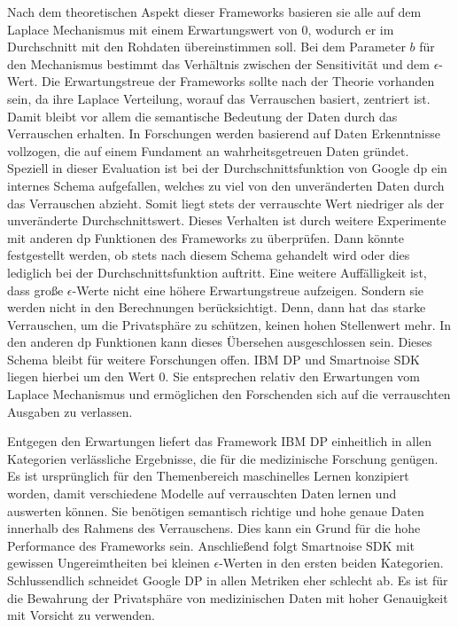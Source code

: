 Nach dem theoretischen Aspekt dieser Frameworks basieren sie alle auf dem Laplace Mechanismus mit einem Erwartungswert von $0$, wodurch er im Durchschnitt mit den Rohdaten übereinstimmen soll. Bei dem Parameter $b$ für den Mechanismus bestimmt das Verhältnis zwischen der Sensitivität und dem $\epsilon$-Wert. Die Erwartungstreue der Frameworks sollte nach der Theorie vorhanden sein, da ihre Laplace Verteilung, worauf das Verrauschen basiert, zentriert ist. Damit bleibt vor allem die semantische Bedeutung der Daten durch das Verrauschen erhalten. In Forschungen werden basierend auf Daten Erkenntnisse vollzogen, die auf einem Fundament an wahrheitsgetreuen Daten gründet. Speziell in dieser Evaluation ist bei der Durchschnittsfunktion von Google \gls{dp}  ein internes Schema aufgefallen, welches zu viel von den unveränderten Daten durch das Verrauschen abzieht. Somit liegt stets der verrauschte Wert niedriger als der unveränderte Durchschnittswert. Dieses Verhalten ist durch weitere Experimente mit anderen \gls{dp} Funktionen des Frameworks zu überprüfen. Dann könnte festgestellt werden, ob stets nach diesem Schema gehandelt wird oder dies lediglich bei der Durchschnittsfunktion auftritt. Eine weitere Auffälligkeit ist, dass große $\epsilon$-Werte nicht eine höhere Erwartungstreue aufzeigen. Sondern sie werden nicht in den Berechnungen berücksichtigt. Denn, dann hat das starke Verrauschen, um die Privatsphäre zu schützen, keinen hohen Stellenwert mehr. In den anderen \gls{dp} Funktionen kann dieses Übersehen ausgeschlossen sein. Dieses Schema bleibt für weitere Forschungen offen. IBM DP und Smartnoise SDK liegen hierbei um den Wert $0$. Sie entsprechen relativ den Erwartungen vom Laplace Mechanismus und ermöglichen den Forschenden sich auf die verrauschten Ausgaben zu verlassen.

Entgegen den Erwartungen liefert das Framework IBM DP einheitlich in allen Kategorien verlässliche Ergebnisse, die für die medizinische Forschung genügen. Es ist ursprünglich für den Themenbereich maschinelles Lernen konzipiert worden, damit verschiedene Modelle auf verrauschten Daten lernen und auswerten können. Sie benötigen semantisch richtige und hohe genaue Daten innerhalb des Rahmens des Verrauschens. Dies kann ein Grund für die hohe Performance des Frameworks sein. Anschließend folgt Smartnoise SDK mit gewissen Ungereimtheiten bei kleinen $\epsilon$-Werten in den ersten beiden Kategorien. Schlussendlich schneidet Google DP in allen Metriken eher schlecht ab. Es ist für die Bewahrung der Privatsphäre von medizinischen Daten mit hoher Genauigkeit mit Vorsicht zu verwenden.

